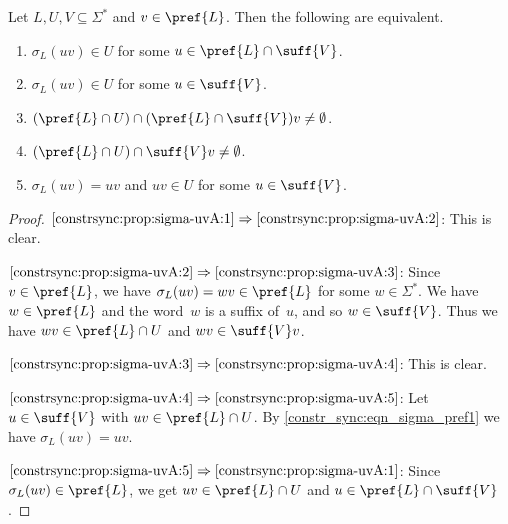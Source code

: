 \begin{proposition} \label{constrsync:prop:sigma-uvA}
	Let $L, U, V \subseteq \Sigma^*$ and $v \in \pref{L}$.
	Then the following are equivalent.
	\begin{enumerate}
			
	\item \label{constrsync:prop:sigma-uvA:1} $\sigma_L(uv) \in U$ for some $u \in \pref{L} \cap \suff{V}$.
		
	\item \label{constrsync:prop:sigma-uvA:2} $\sigma_L(uv) \in U$ for some $u \in \suff{V}$. 
		
	\item \label{constrsync:prop:sigma-uvA:3} $( \pref{L}\cap U ) \cap ( \pref{L} \cap \suff{V} ) v \ne \emptyset$.
		
	\item \label{constrsync:prop:sigma-uvA:4} $( \pref{L}\cap U ) \cap \suff{V}v \ne \emptyset$.
			
	\item \label{constrsync:prop:sigma-uvA:5} $\sigma_L(uv) = uv$ and $uv \in U$ for some $u \in \suff{V}$.
	\end{enumerate}
\end{proposition}
\begin{proof}
$\ref{constrsync:prop:sigma-uvA:1}\Rightarrow\ref{constrsync:prop:sigma-uvA:2}$: This is clear.

$\ref{constrsync:prop:sigma-uvA:2}\Rightarrow\ref{constrsync:prop:sigma-uvA:3}$: Since $v \in \pref{L}$, we have $\sigma_L(uv) = wv \in \pref{L}$ for some $w \in \Sigma^*$.
We have $w \in \pref{L}$ and the word~$w$ is a suffix of~$u$, and so $w \in \suff{V}$.
 Thus we have $wv \in \pref{L}\cap U$ and $wv \in \suff{V}v$.
 
$\ref{constrsync:prop:sigma-uvA:3}\Rightarrow\ref{constrsync:prop:sigma-uvA:4}$: This is clear.

$\ref{constrsync:prop:sigma-uvA:4}\Rightarrow\ref{constrsync:prop:sigma-uvA:5}$: Let $u \in \suff{V}$ with $uv \in \pref{L}\cap U$.
 By \cref{constr_sync:eqn_sigma_pref1} we have $\sigma_L(uv) = uv$.

$\ref{constrsync:prop:sigma-uvA:5}\Rightarrow\ref{constrsync:prop:sigma-uvA:1}$: Since $\sigma_L(uv) \in \pref{L}$,
 we get $uv \in \pref{L}\cap U$ and $u \in \pref{L} \cap \suff{V}$.
\end{proof}

